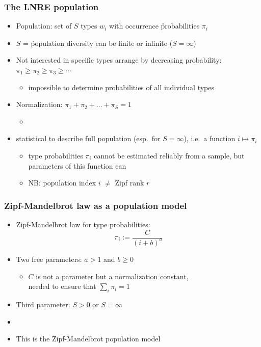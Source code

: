 \documentclass[t]{beamer} %
\begin{document}
\begin{frame}
  \frametitle{The LNRE population}

  \begin{itemize}
  \item Population: set of $S$ types $w_i$ with occurrence \h{probabilities} $\pi_i$
  \item $S$ = \h{population diversity} can be finite or infinite ($S = \infty$)
  \item Not interested in specific types \so  arrange by decreasing
    probability: $\pi_1\geq \pi_2\geq \pi_3 \geq \cdots$
    \begin{itemize}
    \item[\hand] impossible to determine probabilities of all individual types
    \end{itemize}
  \item Normalization: $\pi_1 + \pi_2 + \ldots + \pi_S = 1$
    \begin{itemize}
    \item[]
    \end{itemize}
  \item {} statistical  to describe full population (esp.\ for $S = \infty$),
    i.e.\ a function $i \mapsto \pi_i$
    \begin{itemize}
    \item type probabilities $\pi_i$ cannot be estimated reliably from a sample, but parameters of this function can
    \item NB: population index $i$ $\neq$ Zipf rank $r$
    \end{itemize}
  \end{itemize}
\end{frame}

\begin{frame}
  \frametitle{Zipf-Mandelbrot law as a population model}

  \begin{itemize}
  \item Zipf-Mandelbrot law for type probabilities:
    \[ \pi_i := \frac{C}{(i + b) ^ a} \]
  \item Two free parameters: $a > 1$ and $b \geq 0$
    \begin{itemize}
    \item[\hand] $C$ is not a parameter but a normalization constant,\\
      needed to ensure that $\sum_i \pi_i = 1$
    \end{itemize}
  \item Third parameter: $S > 0$ or $S = \infty$
  \item[]
  \item This is the \h{Zipf-Mandelbrot} population model \citep{Evert:04}
  \end{itemize}
\end{frame}
\end{document}
